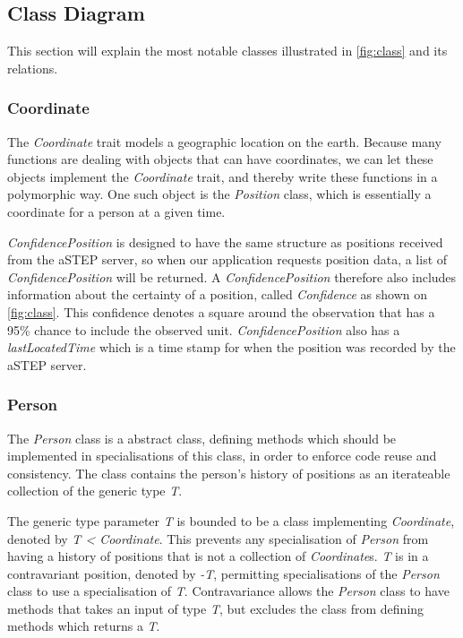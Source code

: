 \subsection{Class Diagram}
This section will explain the most notable classes illustrated in \cref{fig:class} and its relations.

\subsubsection{Coordinate}
The \emph{Coordinate} trait models a geographic location on the earth. Because many functions are dealing with objects that can have coordinates, we can let these objects implement the \emph{Coordinate} trait, and thereby write these functions in a polymorphic way. One such object is the \emph{Position} class, which is essentially a coordinate for a person at a given time.

\emph{ConfidencePosition} is designed to have the same structure as positions received from the aSTEP server, so when our application requests position data, a list of \emph{ConfidencePosition} will be returned. A \emph{ConfidencePosition} therefore also includes information about the certainty of a position, called \emph{Confidence} as shown on \cref{fig:class}. This confidence denotes a square around the observation that has a 95\% chance to include the observed unit\cite{cisco}. \emph{ConfidencePosition} also has a \emph{lastLocatedTime} which is a time stamp for when the position was recorded by the aSTEP server.

\subsubsection{Person}
The \emph{Person} class is a abstract class, defining methods which should be implemented in specialisations of this class, in order to enforce code reuse and consistency. The class contains the person's history of positions as an iterateable collection of the generic type \emph{T}. 

The generic type parameter \emph{T} is bounded to be a class implementing \emph{Coordinate}, denoted by \emph{T < Coordinate}. This prevents any specialisation of \emph{Person} from having a history of positions that is not a collection of \emph{Coordinate}s. \emph{T} is in a contravariant position, denoted by \emph{-T}, permitting specialisations of the \emph{Person} class to use a specialisation of \emph{T}. Contravariance allows the \emph{Person} class to have methods that takes an input of type \emph{T}, but excludes the class from defining methods which returns a \emph{T}. 

